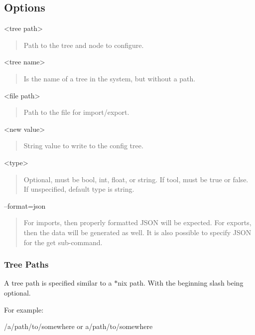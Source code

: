 \subsection*{Options}

\begin{DoxyVerb}<tree path> \end{DoxyVerb}
 \begin{quote}
Path to the tree and node to configure. \end{quote}


\begin{DoxyVerb}<tree name> \end{DoxyVerb}
 \begin{quote}
Is the name of a tree in the system, but without a path. \end{quote}


\begin{DoxyVerb}<file path> \end{DoxyVerb}
 \begin{quote}
Path to the file for import/export. \end{quote}


\begin{DoxyVerb}<new value> \end{DoxyVerb}
 \begin{quote}
String value to write to the config tree. \end{quote}


\begin{DoxyVerb}<type> \end{DoxyVerb}
 \begin{quote}
Optional, must be bool, int, float, or string. If tool, must be true or false. If unspecified, default type is string. \end{quote}


\begin{DoxyVerb}--format=json \end{DoxyVerb}
 \begin{quote}
For imports, then properly formatted J\+S\+O\+N will be expected. For exports, then the data will be generated as well. It is also possible to specify J\+S\+O\+N for the get sub-\/command. \end{quote}
\hypertarget{tools_target_config_toolsTarget_config_treePaths}{}\subsubsection{Tree Paths}\label{tools_target_config_toolsTarget_config_treePaths}
A tree path is specified similar to a {\ttfamily $\ast$nix} path. With the beginning slash being optional. \begin{DoxyVerb}For example:

    /a/path/to/somewhere
or
    a/path/to/somewhere
\end{DoxyVerb}


